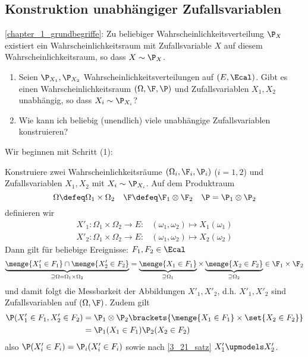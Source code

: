 \subsection{Konstruktion unabhängiger Zufallsvariablen}
\cref{chapter_1_grundbegriffe}: Zu beliebiger Wahrscheinlichkeitsverteilung $\P_X$ existiert ein Wahrscheinlichkeitsraum mit Zufallsvariable $X$ auf diesem Wahrscheinlichkeitsraum, so dass $X \sim \P_X$.

\begin{enumerate}[leftmargin=*, nolistsep]
	\item Seien $\P_{X_1}, \P_{X_2}$ Wahrscheinlichkeitsverteilungen auf $(E, \Ecal)$. Gibt es einen Wahrscheinlichkeitsraum $(\Omega, \F, \P)$ und Zufallsvariablen $X_1, X_2$ unabhängig, so dass $X_i \sim \P_{X_i}$?
	\item Wie kann ich beliebig (unendlich) viele unabhängige Zufallsvariablen konstruieren?
\end{enumerate}

Wir beginnen mit Schritt (1):

Konstruiere zwei Wahrscheinlichkeitsräume $(\Omega_i, \F_i, \P_i)$ ($i = 1,2$) und Zufallsvariablen $X_1, X_2$ mit $X_i \sim \P_{X_i}$. Auf dem Produktraum
\begin{equation*}
	\Omega \defeq \Omega_1 \times \Omega_2 \quad \F \defeq \F_1 \otimes \F_2 \quad \P = \P_1 \otimes \P_2
\end{equation*}
definieren wir
\begin{equation*}
\begin{aligned}
	X'_1 \colon \Omega_1 \times \Omega_2 \to E : &(\omega_1, \omega_2) \mapsto X_1(\omega_1) \\
	X'_2 \colon \Omega_1 \times \Omega_2 \to E : &(\omega_1, \omega_2) \mapsto X_2(\omega_2)
\end{aligned}
\end{equation*}
Dann gilt für beliebige Ereignisse: $F_1, F_2 \in \Ecal$
\begin{equation*}
	\underbrace{\menge{X'_1 \in F_1} \cap \menge{X'_2 \in F_2}}_{\supseteq \Omega = \Omega_1 \times \Omega_2} = \underbrace{\menge{X_1 \in F_1}}_{\supseteq \Omega_1} \times \underbrace{\menge{X_2 \in F_2}}_{\supseteq \Omega_2} \in \F_1 \times \F_2
\end{equation*}
und damit folgt die Messbarkeit der Abbildungen $X'_1, X'_2$, d.h. $X'_1, X'_2$ sind Zufallsvariablen auf $(\Omega, \F)$. Zudem gilt
\begin{equation*}
\begin{aligned}
	\P(X'_1 \in F_1, X'_2 \in F_2)
	&= \P_1 \otimes \P_2 \brackets{\menge{X_1 \in F_1} \times \set{X_2 \in F_2}} \\
	&= \P_1 (X_1 \in F_1) \P_2(X_2 \in F_2)
\end{aligned}
\end{equation*}
also $\P(X'_i \in F_i) = \P_i (X'_i \in F_i)$ sowie nach \cref{3_21_satz} $X'_1 \upmodels X'_2$.

